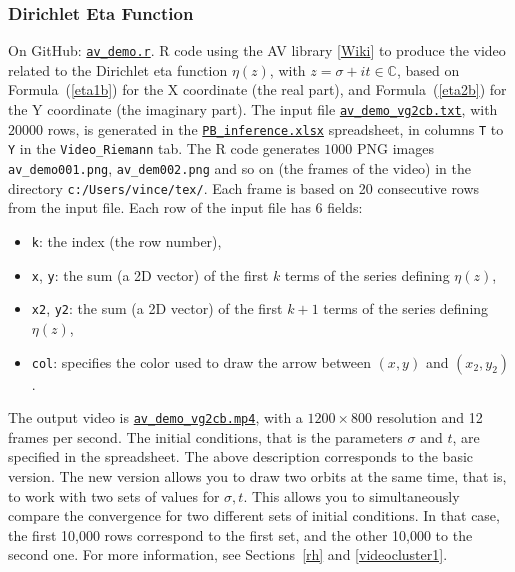 \documentclass[10pt]{article}
\begin{document}
\subsubsection{Dirichlet Eta Function}\label{etavis}
{On GitHub}: \href{https://github.com/VincentGranville/Point-Processes/blob/main/Videos/av_demo.r}{\texttt{av\_demo.r}}. R code using the AV library [\href{https://ropensci.org/blog/2018/10/06/av-release/}{Wiki}] to produce the video related to the Dirichlet eta function $\eta(z)$, with $z=\sigma+it\in\mathbb{C}$, based on Formula~(\ref{eta1b}) for the X coordinate (the real part), and
Formula~(\ref{eta2b}) for the Y coordinate (the imaginary part). The input file
\href{https://github.com/VincentGranville/Point-Processes/blob/main/Videos/av_demo_vg2cb.txt}{\texttt{av\_demo\_vg2cb.txt}}, with $\num{20000}$ rows, is generated in the
\href{https://github.com/VincentGranville/Point-Processes/tree/main/Spreadsheets}{\texttt{PB\_inference.xlsx}} spreadsheet, in columns \texttt{T} to \texttt{Y} in the
\texttt{Video\_Riemann} tab. The R code generates $\num{1000}$ PNG images
\texttt{av\_demo001.png}, \texttt{av\_dem002.png} and so on
(the frames of the video) in the directory \texttt{c:/Users/vince/tex/}. Each frame is based on 20 consecutive rows from the input file. Each row of the input file has 6 fields:
\begin{itemize}
\item \texttt{k}: the index (the row number),
\item \texttt{x}, \texttt{y}: the sum (a 2D vector) of the first $k$ terms of the series defining $\eta(z)$,
\item \texttt{x2}, \texttt{y2}:  the sum (a 2D vector) of the first $k+1$ terms of the series defining $\eta(z)$,
\item \texttt{col}: specifies the color used to draw the arrow between $(x,y)$ and $(x_2,y_2)$.
\end{itemize}
The output video is \href{https://www.youtube.com/watch?v=FUxAeW4JEXA}{\texttt{av\_demo\_vg2cb.mp4}}, with a $1200 \times 800$ resolution and 12 frames per second.
The initial conditions, that is the parameters $\sigma$ and $t$, are specified in the spreadsheet. The above description corresponds to the basic version.
The new version allows you to draw two orbits at the same time, that is, to work with two sets of values for $\sigma,t$. This allows you to
simultaneously compare the convergence for two different sets of
initial conditions. In that case, the first 10,000 rows correspond to the first set, and the other 10,000 to the second one. For more information,
see Sections~\ref{rh} and \ref{videocluster1}.
\end{document}
